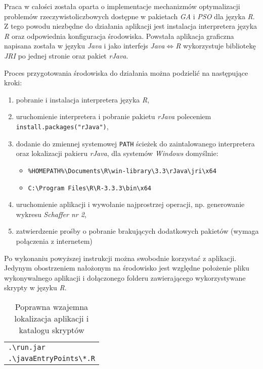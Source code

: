 \par
Praca w całości została oparta o implementacje mechanizmów optymalizacji problemów rzeczywistoliczbowych dostępne w pakietach \emph{GA} i \emph{PSO} dla języka \emph{R}. Z tego powodu niezbędne do działania aplikacji jest instalacja interpretera języka \emph{R} oraz odpowiednia konfiguracja środowiska. Powstała aplikacja graficzna napisana została w języku \emph{Java} i jako interfejs \emph{Java}$\Leftrightarrow$\emph{R} wykorzystuje bibliotekę \emph{JRI} po jednej stronie oraz pakiet \emph{rJava}.

\par
Proces przygotowania środowiska do działania można podzielić na następujące kroki:
\begin{enumerate}
\item pobranie i instalacja interpretera języka \emph{R},
\item uruchomienie interpretera i pobranie pakietu \emph{rJava} poleceniem \lstinline{install.packages("rJava")},
\item dodanie do zmiennej systemowej \lstinline{PATH} ścieżek do zaintalowanego interpretera oraz lokalizacji pakieru \emph{rJava}, dla systemów \emph{Windows} domyślnie:
\begin{itemize}
\item \lstinline{%HOMEPATH%\Documents\R\win-library\3.3\rJava\jri\x64}
\item \lstinline{C:\Program Files\R\R-3.3.3\bin\x64}
\end{itemize}
\item uruchomienie aplikacji i wywołanie najprostrzej operacji, np. generowanie wykresu \emph{Schaffer nr 2},
\item zatwierdzenie prośby o pobranie brakujących dodatkowych pakietów (wymaga połączenia z internetem)
\end{enumerate}
Po wykonaniu powyższej instrukcji można swobodnie korzystać z aplikacji. Jedynym obostrzeniem nałożonym na środowisko jest względne położenie pliku wykonywalnego aplikacji i dołączonego folderu zawierającego wykorzystywane skrypty w języku \emph{R}. 


\begin{table}[ht]
\caption{Poprawna wzajemna lokalizacja aplikacji i katalogu skryptów}
\label{table:app01-lokalizacja}
\begin{center}
\begin{tabular}{|l|}
	\hline
	{\lstinline[]$.\run.jar$} \\
	{\lstinline[]$.\javaEntryPoints\*.R$} \\
	\hline
	\end{tabular}

\end{center}
\end{table}





